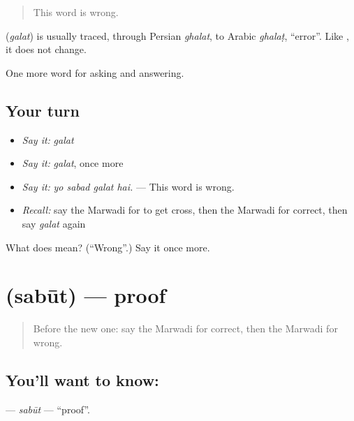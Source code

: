 \begin{quote}
This word is wrong.
\end{quote}

\begin{cousinweb}
\textbf{} (\emph{galat}) is usually traced, through Persian \emph{ghalat}, to Arabic \emph{ghalaṭ}, \textquotedblleft{}error\textquotedblright{}. Like \textbf{}, it does not change.
\end{cousinweb}

\begin{grammarlens}[title={What you've built}]
One more word for asking and answering.
\end{grammarlens}

\subsection*{Your turn}
\begin{itemize}
\raggedright
  \item \emph{Say it:} \emph{galat}
  \item \emph{Say it:} \emph{galat}, once more
  \item \emph{Say it:} \emph{yo sabad galat hai.} — This word is wrong.
  \item \emph{Recall:} say the Marwadi for to get cross, then the Marwadi for correct, then say \emph{galat} again
\end{itemize}

\begin{tcolorbox}[breakable,colback=teal!4,colframe=teal!35!black,title={Before you move on}]
What does  mean? (\textquotedblleft{}Wrong\textquotedblright{}.) Say it once more.
\end{tcolorbox}
\section[\texorpdfstring{\mw{सबूत} (sabūt)}{सबूत (sabūt)}]{ (sabūt) — proof}

\label{lesson:MW-C271-sabut}



\begin{quote}
Before the new one: say the Marwadi for correct, then the Marwadi for wrong.
\end{quote}

\subsection*{You'll want to know: }
\textbf{} — \emph{sabūt} — \textquotedblleft{}proof\textquotedblright{}.

